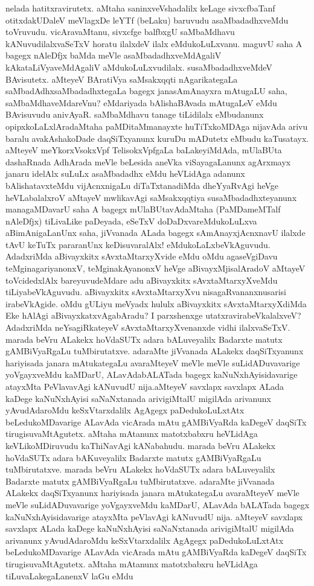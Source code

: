 nelada hatitxravirutetx. aMtaha saninxveVshadalilx keLage sivxcfbaTanf otitxdakUDaleV meVlagxDe leYTf (beLaku) baruvudu asaMbadadhxveMdu toVruvudu. vicAravaMtanu, \hbox{sivxcfge} balfbxgU saMbaMdhavu kANuvu\-dilalx\-vaSeTxV horatu ilalxdeV ilalx eMdukoLuLxvanu. maguvU saha A bagegx nAleDfjx baMda meVle asaM\-badadhx\-veMdAgaliV kAkataLiVya\-veMdAgaliV aMdukoLuLxvudilalx. susaMbadadhxveMdeV BAvisutetx. aMteyeV BAra\-tiVya saMsakxqqti nAgarikategaLa saMbadAdhxsaMbadadhxtegaLa bagegx janasAmAnayxra mAtu\-gaLU saha, saMbaMdha\-veMda\-reVnu? eMdariyada bAlishaBAvada mAtugaLeV eMdu BAvisu\-vudu ani\-vAyaR. saMbaMdhavu\- tanage tiLi\-dilalx eMbudanunx opipxkoLaLx\-lAra\-daMtaha paMDitaMmanayxte huTiTx\-koMDAga nija\-vAda arivu bara\-lu ava\-kAsha\-koDade daqSiTxyanunx kuruDu mADutetx  eMbudu kaTusatayx. aMteyeV  meYkorxV\-sokxVpf Teli\-sokxVpf\-gaLa baLakeyiMdAda, mUlaBUta dashaRnada AdhArada meVle beLesida aneVka viSaya\-gaLanunx \-agArxmayx janaru idelAlx suLuLx asaMbadadhx eMdu heVLi\-dAga adanunx bAlishatavxteMdu vijAcnxnigaLu diTaTx\-tana\-diMda dheYyaRvAgi heVge heVLa\-balalxroV aMtayeV mwlikavAgi saMsakxqqtiya susaMbadadhxteyanunx mana\-gaMDa\-varU saha A bagegx mUlaBUtavAdaMtaha (PaMDameMTalf nAleDfjx) tiLivaLike paDeyada, eSeTxV doDaDxva\-reMdu\-koLuLxva aBimAnigaLanUnx saha, jiVvanada ALada bagegx sAmAnayxjAcnxnavU ilalxde tAvU \-keTuTx pararanUnx keDisuvaralAlx! eMdukoLaLxbeVkAguvudu. AdadxriMda aBivayxkitx sAvxtaMtarxyXvide eMdu oMdu agaseVgiDavu teMginagariyanonxV, teMginakAyanonxV heVge aBi\-vayxMjisa\-lAradoV \-aMtayeV toVci\-dedxlAlx bareyuvudeMdare adu aBivayxkitx sAvxtaMtarxyXveMdu tiLiyabeVkAguvudu. aBi\-vayxkitx sAvxtaM\-tarxyXvu nisagaRvananxnusarisi irabeVkAgide. oMdu gULiyu meVyadx hululx aBi\-vayxkitx sAvxtaMtarxyX\-diMda Eke hAlAgi aBivayxkatxvAgabAradu? I parxshenxge utatxravirabeVka\-lalxveV? AdadxriMda neYsagiR\-kateyeV sAvxtaM\-tarxyXvenanxde vidhi ilalxvaSeTxV. marada beVru ALakekx hoVdaSUTx adara bALuveyalilx Badarxte matutx gAMBiVyaR\-gaLu tuMbiru\-tatxve. adaraMte jiVvanada ALakekx daqSiTxyanunx hariyisada janara mAtukategaLu ava\-raMteyeV meVle meVle suLidADuvavarige yoVgayxveMdu kaMDarU, ALavAda\break bALATada bagegx kaNuNx\-hAyisidavarige atayxMta PeVlavavAgi kANuvudU nija.\break aMteyeV savxlapx savxlapx ALada kaDege kaNuNxhAyisi saNaNxtanada arivi\-giMtalU migi\-lAda arivanunx yAvudAdaroMdu keSxVtarxdalilx AgAgegx paDedukoLuLxtAtx beLedu\-koMDava\-rige ALavAda vicArada mAtu gAMBiV\-yaRda kaDegeV daqSiTx tiru\-gisu\-vaMtA\-gutetx. aMtaha mAtanunx matotx\-babxru heVLidAga keVLikoMDiruvudu kaThiNa\-vAgi kANa\-bahudu. marada beVru ALakekx hoVdaSUTx\- adara bAKuveyalilx Badarxte matutx gAMBiVyaRgaLu tuMbirutatxve. marada beVru ALakekx hoVdaSUTx adara bALuveyalilx Badarxte matutx gAMBiVyaRgaLu tuMbirutatxve. adaraMte jiVvanada ALakekx daqSiTx\-yanunx hariyisada janara mAtukategaLu avaraMteyeV meVle meVle suLidADuvavarige yoVgayx\-veMdu kaMDarU,\- ALavAda bALATada bagegx kaNuNxhAyisidavarige atayxMta peVlavAgi kANuvudU nija. aMteyeV savxlapx savxlapx ALada kaDege kaNuNxhAyisi saNaNxtanada arivigiMtalU migilAda arivanunx yAvudAdaroMdu keSxVtarx\-dalilx AgAgegx paDedukoLuLxtAtx beLedukoMDavarige ALavAda vicArada mAtu gAMBiVyaRda kaDegeV daqSiTx tirugisu\-vaMtAgutetx. aMtaha mAtanunx matotxbabxru heVLidAga tiLuvaLakegaLanenxV laGu eMdu 